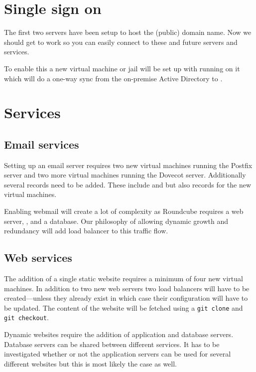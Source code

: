 \documentclass[a4paper,12pt,twoside]{scrartcl}
\begin{document}
\section{Single sign on}
\label{sec:sso}
The first two servers have been setup to host the (public) domain name.
Now we should get  to work so you can easily connect to these and future servers and services.

To enable this a new virtual machine or jail will be set up with  running on it which will do a one-way sync from the on-premise Active Directory to .


\section{Services}
\label{sec:services}

\subsection{Email services}
Setting up an email server requires two new virtual machines running the Postfix  server and two more virtual machines running the Dovecot  server.
Additionally several  records need to be added.
These include  and  but also  records for the new virtual machines.

Enabling webmail will create a lot of complexity as Roundcube requires a web server, , and a database.
Our philosophy of allowing dynamic growth and redundancy will add load balancer to this traffic flow.

\subsection{Web services}
The addition of a single static website requires a minimum of four new virtual machines.
In addition to two new web servers two load balancers will have to be created---unless they already exist in which case their configuration will have to be updated.
The content of the website will be fetched using a \texttt{git clone} and \texttt{git checkout}.

Dynamic websites require the addition of application and database servers.
Database servers can be shared between different services.
It has to be investigated whether or not the application servers can be used for several different websites but this is most likely the case as well.
\end{document}
